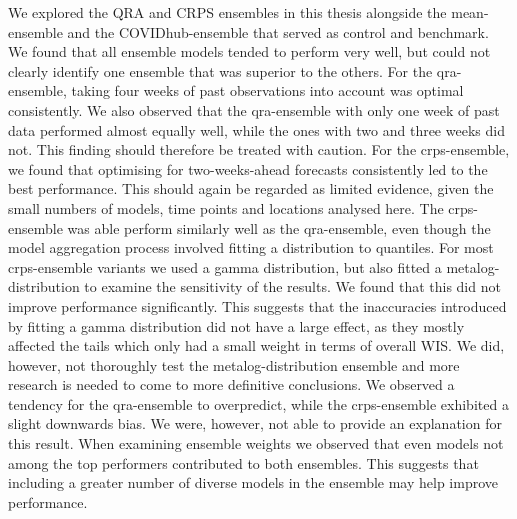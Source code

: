 \documentclass[
]{book}
\begin{document}
We explored the QRA and CRPS ensembles in this thesis alongside the mean-ensemble and the COVIDhub-ensemble that served as control and benchmark. We found that all ensemble models tended to perform very well, but could not clearly identify one ensemble that was superior to the others. For the qra-ensemble, taking four weeks of past observations into account was optimal consistently. We also observed that the qra-ensemble with only one week of past data performed almost equally well, while the ones with two and three weeks did not. This finding should therefore be treated with caution. For the crps-ensemble, we found that optimising for two-weeks-ahead forecasts consistently led to the best performance. This should again be regarded as limited evidence, given the small numbers of models, time points and locations analysed here. The crps-ensemble was able perform similarly well as the qra-ensemble, even though the model aggregation process involved fitting a distribution to quantiles. For most crps-ensemble variants we used a gamma distribution, but also fitted a metalog-distribution to examine the sensitivity of the results. We found that this did not improve performance significantly. This suggests that the inaccuracies introduced by fitting a gamma distribution did not have a large effect, as they mostly affected the tails which only had a small weight in terms of overall WIS. We did, however, not thoroughly test the metalog-distribution ensemble and more research is needed to come to more definitive conclusions. We observed a tendency for the qra-ensemble to overpredict, while the crps-ensemble exhibited a slight downwards bias. We were, however, not able to provide an explanation for this result. When examining ensemble weights we observed that even models not among the top performers contributed to both ensembles. This suggests that including a greater number of diverse models in the ensemble may help improve performance.
\end{document}
